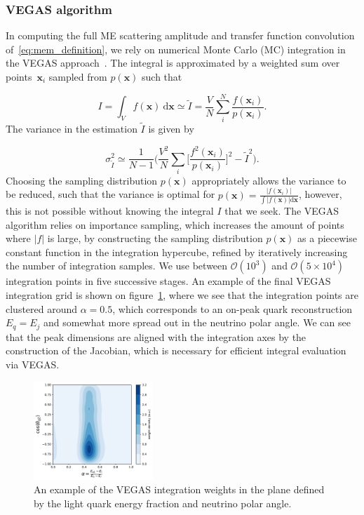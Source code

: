 \subsubsection{VEGAS algorithm}
In computing the full ME scattering amplitude and transfer function convolution of~\cref{eq:mem_definition}, we rely on numerical Monte Carlo (MC) integration in the VEGAS approach~\cite{Lepage:1977sw}. The integral is approximated by a weighted sum over points~$\mathbf{x}_i$ sampled from $p(\mathbf{x})$ such that

\begin{equation}
I = \int_V f(\mathbf{x})\ \mathrm{d}\mathbf{x} \simeq \tilde{I} = \frac{V}{N} \sum_{i}^N \frac{f(\mathbf{x}_i)}{p(\mathbf{x}_i)}.
\end{equation}
The variance in the estimation $\tilde{I}$ is given by

$$
\sigma_{\tilde{I}}^2 \simeq \frac{1}{N-1} \biggl( \frac{V^2}{N} \sum_i \biggl[\frac{f^2(\mathbf{x}_i)} {p(\mathbf{x}_i)} \biggr]^2 - \tilde{I}^2 \biggr).
$$
Choosing the sampling distribution $p(\mathbf{x})$ appropriately allows the variance to be reduced, such that the variance is optimal for $p(\mathbf{x}) = \frac{|f(\mathbf{x}_i)|}{\int |f(\mathbf{x})| \mathrm{d}\mathbf{x}}$, however, this is not possible without knowing the integral $I$ that we seek. The VEGAS algorithm relies on importance sampling, which increases the amount of points where $|f|$ is large, by constructing the sampling distribution $p(\mathbf{x})$ as a piecewise constant function in the integration hypercube, refined by iteratively increasing the number of integration samples. We use between $\mathcal{O}(10^3)$ and $\mathcal{O}(5 \times 10^4)$ integration points in five successive stages. An example of the final VEGAS integration grid is shown on figure~\cref{fig:vegas_grid}, where we see that the integration points are clustered around $\alpha=0.5$, which corresponds to an on-peak quark reconstruction $E_q = E_j$ and somewhat more spread out in the neutrino polar angle. We can see that the peak dimensions are aligned with the integration axes by the construction of the Jacobian, which is necessary for efficient integral evaluation via VEGAS.

\begin{figure}[ht]
\begin{centering}
\includegraphics[width = 0.4\textwidth]{figures/mem/vegas_grid.pdf}
\caption[VEGAS integration grid example]{An example of the VEGAS integration weights in the plane defined by the light quark energy fraction and neutrino polar angle.}
\label{fig:vegas_grid}
\end{centering}
\end{figure}

